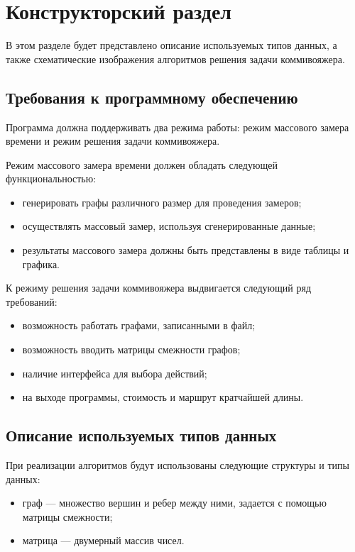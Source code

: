 \chapter{Конструкторский раздел}

В этом разделе будет представлено описание используемых типов данных, а также схематические изображения алгоритмов решения задачи коммивояжера.

\section{Требования к программному обеспечению}

Программа должна поддерживать два режима работы: режим массового замера времени и режим решения задачи коммивояжера.

Режим массового замера времени должен обладать следующей функциональностью:
\begin{itemize}
	\item генерировать графы различного размер для проведения замеров;
	\item осуществлять массовый замер, используя сгенерированные данные;
	\item результаты массового замера должны быть представлены в виде таблицы и графика.
\end{itemize}

К режиму решения задачи коммивояжера выдвигается следующий ряд требований:
\begin{itemize}
	\item возможность работать графами, записанными в файл;
	\item возможность вводить матрицы смежности графов;
	\item наличие интерфейса для выбора действий;
	\item на выходе программы, стоимость и маршрут кратчайшей длины.
\end{itemize}

\section{Описание используемых типов данных}

При реализации алгоритмов будут использованы следующие структуры и типы данных:
\begin{itemize}
	\item граф --- множество вершин и ребер между ними, задается с помощью матрицы смежности;
	\item матрица --- двумерный массив чисел.
\end{itemize}

